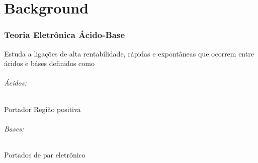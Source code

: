 \documentclass{article}
\begin{document}

%
%
%
%
%


%


\newpage



\part{Background}



\section{Teoria Eletrônica Ácido-Base}
\label{Background - lewis}
Estuda a ligações de alta rentabilidade, rápidas e expontâneas que ocorrem entre ácidos e báses definidos como
\begin{multicols}{2}
	\paragraph{Ácidos:} Portador Região positiva
\\	\paragraph{Bases:} Portados de par eletrônico
\end{multicols}
\end{document}
